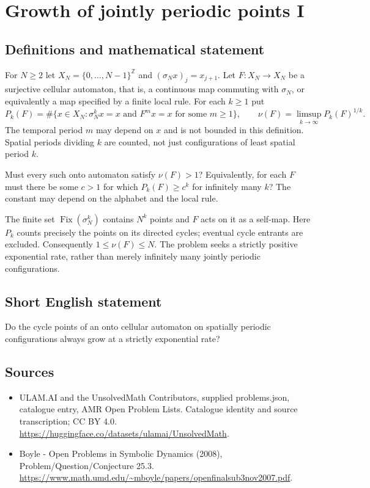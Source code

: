 \documentclass[11pt,a4paper]{article}
\begin{document}
\section*{Growth of jointly periodic points I}\label{statement}

\subsection{Definitions and mathematical statement}
For $N\ge2$ let $X_N=\{0,\ldots,N-1\}^{\mathbb Z}$ and
$(\sigma_Nx)_j=x_{j+1}$. Let $F:X_N\to X_N$ be a surjective
cellular automaton, that is, a continuous map commuting with
$\sigma_N$, or equivalently a map specified by a finite local
rule. For each $k\ge1$ put
\[
 P_k(F)=\#\{x\in X_N:\sigma_N^k x=x
                  \text{ and }F^m x=x\text{ for some }m\ge1\},
 \qquad \nu(F)=\limsup_{k\to\infty}P_k(F)^{1/k}.
\]
The temporal period $m$ may depend on $x$ and is not bounded
in this definition. Spatial periods dividing $k$ are counted,
not just configurations of least spatial period $k$.

Must every such onto automaton satisfy $\nu(F)>1$?
Equivalently, for each $F$ must there be some $c>1$ for which
$P_k(F)\ge c^k$ for infinitely many $k$? The constant may
depend on the alphabet and the local rule.

The finite set $\operatorname{Fix}(\sigma_N^k)$ contains
$N^k$ points and $F$ acts on it as a self-map. Here $P_k$
counts precisely the points on its directed cycles; eventual
cycle entrants are excluded. Consequently $1\le\nu(F)\le N$.
The problem seeks a strictly positive exponential rate, rather
than merely infinitely many jointly periodic configurations.
\subsection{Short English statement}
Do the cycle points of an onto cellular automaton on spatially periodic configurations always grow at a strictly exponential rate?
\subsection{Sources}
\begin{itemize}
\item[S1] ULAM.AI and the UnsolvedMath Contributors, supplied problems.json, catalogue entry, AMR Open Problem Lists. Catalogue identity and source transcription; CC BY 4.0.
\url{https://huggingface.co/datasets/ulamai/UnsolvedMath}.
\item[S2] Boyle - Open Problems in Symbolic Dynamics (2008), Problem/Question/Conjecture 25.3. 
\url{https://www.math.umd.edu/~mboyle/papers/openfinalsub3nov2007.pdf}.
\end{itemize}
\end{document}
